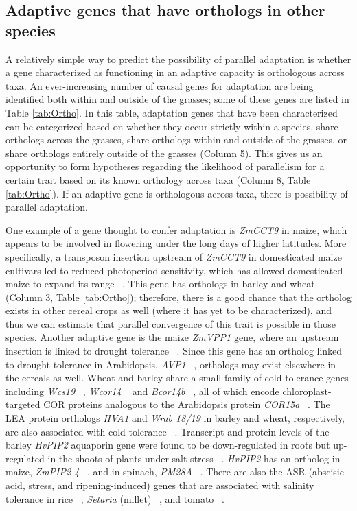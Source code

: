 \documentclass[12pt]{article}
\begin{document}
\subsection*{Adaptive genes that have orthologs in other species}
A relatively simple way to predict the possibility of parallel adaptation is whether a gene characterized as functioning in an adaptive capacity is orthologous across taxa. 
An ever-increasing number of causal genes for adaptation are being identified both within and outside of the grasses; some of these genes are listed in Table \ref{tab:Ortho}.
In this table, adaptation genes that have been characterized can be categorized based on whether they occur strictly within a species, share orthologs across the grasses, share orthologs within and outside of the grasses, or share orthologs entirely outside of the grasses (Column 5).
This gives us an opportunity to form hypotheses regarding the likelihood of parallelism for a certain trait based on its known orthology across taxa (Column 8, Table \ref{tab:Ortho}). If an adaptive gene is orthologous across taxa, there is possibility of parallel adaptation. 

One example of a gene thought to confer adaptation is \textit{ZmCCT9} in maize, which appears to be involved in flowering under the long days of higher latitudes.
More specifically, a transposon insertion upstream of \textit{ZmCCT9} in domesticated maize cultivars led to reduced photoperiod sensitivity, which has allowed domesticated maize to expand its range ~\citep{Huang2017}. 
This gene has orthologs in barley and wheat (Column 3, Table \ref{tab:Ortho}); therefore, there is a good chance that the ortholog exists in other cereal crops as well (where it has yet to be characterized), and thus we can estimate that parallel convergence of this trait is possible in those species.
Another adaptive gene is the maize \textit{ZmVPP1} gene, where an upstream insertion is linked to drought tolerance ~\citep{Wang2016}.
Since this gene has an ortholog linked to drought tolerance in Arabidopsis, \textit{AVP1} ~\citep{Gaxiola2001}, orthologs may exist elsewhere in the cereals as well.
Wheat and barley share a small family of cold-tolerance genes including \textit{Wcs19} ~\citep{pmid8219063}, \textit{Wcor14} ~\citep{pmid10846621} and \textit{Bcor14b} ~\citep{pmid9952464}, all of which encode chloroplast-targeted COR proteins analogous to the Arabidopsis protein \textit{COR15a}  ~\citep{pmid9826741, Takumi2003}.
The LEA protein orthologs \textit{HVA1} and \textit{Wrab 18/19} in barley and wheat, respectively, are also associated with cold tolerance ~\citep{Hong1988, pmid16755132}.
Transcript and protein levels of the barley \textit{HvPIP2} aquaporin gene were found to be down-regulated in roots but up-regulated in the shoots of plants under salt stress ~\citep{Katsuhara2002}.
\textit{HvPIP2} has an ortholog in maize, \textit{ZmPIP2-4} ~\citep{Zhu2005}, and in spinach, \textit{PM28A} ~\citep{Fotiadis2000}.
There are also the ASR (abscisic acid, stress, and ripening-induced) genes that are associated with salinity tolerance in rice ~\citep{Joo2013}, \textit{Setaria} (millet) ~\citep{Li2017}, and tomato ~\citep{Konrad2008}.  
\end{document}
